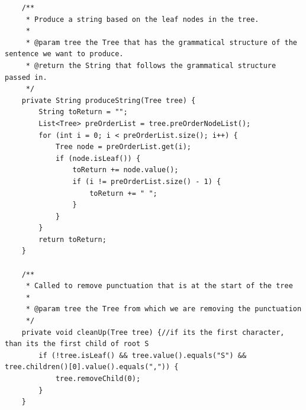 \begin{lstlisting}
    /**
     * Produce a string based on the leaf nodes in the tree.
     *
     * @param tree the Tree that has the grammatical structure of the sentence we want to produce.
     * @return the String that follows the grammatical structure passed in.
     */
    private String produceString(Tree tree) {
        String toReturn = "";
        List<Tree> preOrderList = tree.preOrderNodeList();
        for (int i = 0; i < preOrderList.size(); i++) {
            Tree node = preOrderList.get(i);
            if (node.isLeaf()) {
                toReturn += node.value();
                if (i != preOrderList.size() - 1) {
                    toReturn += " ";
                }
            }
        }
        return toReturn;
    }

    /**
     * Called to remove punctuation that is at the start of the tree
     *
     * @param tree the Tree from which we are removing the punctuation
     */
    private void cleanUp(Tree tree) {//if its the first character, than its the first child of root S
        if (!tree.isLeaf() && tree.value().equals("S") && tree.children()[0].value().equals(",")) {
            tree.removeChild(0);
        }
    }


\end{lstlisting}
